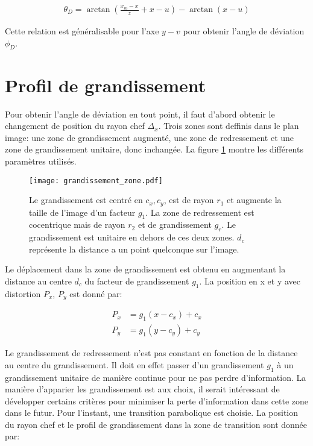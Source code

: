 \documentclass[a4paper,10pt]{article}
\numberwithin{equation}{section}
\numberwithin{figure}{section}
\numberwithin{table}{section}
\begin{document}
\begin{align}
	\theta_D = \arctan\left(\frac{x_m-x}{z} + x - u\right) - \arctan(x-u)
	\label{eq:thetaD}
\end{align}

Cette relation est généralisable pour l'axe $y-v$ pour obtenir l'angle de déviation $\phi_D$.

\section{Profil de grandissement}

Pour obtenir l'angle de déviation en tout point, il faut d'abord obtenir le changement de position du rayon chef $\Delta_x$. Trois zones sont deffinis dans le plan image: une zone de grandissement augmenté, une zone de redressement et une zone de grandissement unitaire, donc inchangée. La figure \ref{fig:grandissement_zone} montre les différents paramètres utilisés.

\begin{figure}[ht]
	\centering
	\texttt{[image: grandissement\_zone.pdf]}
	\caption{Le grandissement est centré en $c_x , c_y$, est de rayon $r_1$ et augmente la taille de l'image d'un facteur $g_1$. La zone de redressement est cocentrique mais de rayon $r_2$ et de grandissement $g_r$. Le grandissement est unitaire en dehors de ces deux zones. $d_c$ représente la distance a un point quelconque sur l'image.}
	\label{fig:grandissement_zone}
\end{figure}

Le déplacement dans la zone de grandissement est obtenu en augmentant la distance au centre $d_c$ du facteur de grandissement $g_1$. La position en x et y avec distortion $P_x$, $P_y$ est donné par:

\begin{align}
	P_x &= g_1(x-c_x) + c_x \\
	P_y &= g_1(y-c_y) + c_y
\end{align}

Le grandissement de redressement n'est pas constant en fonction de la distance au centre du grandissement. Il doit en effet passer d'un grandissement $g_1$ à un grandissement unitaire de manière continue pour ne pas perdre d'information. La manière d'apparier les grandissement est aux choix, il serait intéressant de développer certains critères pour minimiser la perte d'information dans cette zone dans le futur. Pour l'instant, une transition parabolique est choisie. La position du rayon chef et le profil de grandissement dans la zone de transition sont donnée par:
\end{document}
